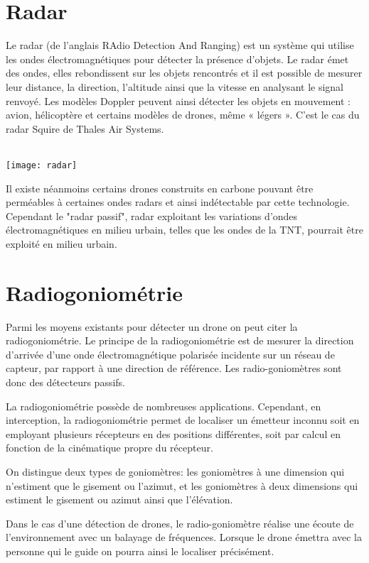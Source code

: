 \section{Radar}
Le radar (de l'anglais RAdio Detection And Ranging) est un système qui utilise les ondes électromagnétiques pour détecter la présence d'objets. Le radar émet des ondes, elles rebondissent sur les objets rencontrés et il est possible de mesurer leur distance, la direction, l'altitude ainsi que la vitesse en analysant le signal renvoyé. Les modèles Doppler peuvent ainsi détecter les objets en mouvement : avion, hélicoptère et certains modèles de drones, même « légers ». C'est le cas du radar Squire de Thales Air Systems. 

~\\

\texttt{[image: radar]}

Il existe néanmoins certains drones construits en carbone pouvant être perméables à certaines ondes radars et ainsi indétectable par cette technologie. Cependant le "radar passif", radar exploitant les variations d'ondes électromagnétiques en milieu urbain, telles que les ondes de la TNT, pourrait être exploité en milieu urbain.



\section{Radiogoniométrie}

Parmi les moyens existants pour détecter un drone on peut citer la radiogoniométrie. Le principe de la radiogoniométrie est de mesurer la direction d'arrivée d'une onde électromagnétique polarisée incidente sur un réseau de capteur, par rapport à une direction de référence. Les radio-goniomètres sont donc des détecteurs passifs. 

La radiogoniométrie possède de nombreuses applications. Cependant, en interception, la radiogoniométrie permet de localiser un émetteur inconnu soit en employant plusieurs récepteurs en des positions différentes, soit par calcul en fonction de la cinématique propre du récepteur. 

On distingue deux types de goniomètres: les goniomètres à une dimension qui n'estiment que le gisement ou l'azimut, et les goniomètres à deux dimensions qui estiment le gisement ou azimut ainsi que l'élévation. 


Dans le cas d'une détection de drones, le radio-goniomètre réalise une écoute de l'environnement avec un balayage de fréquences. Lorsque le drone émettra avec la personne qui le guide on pourra ainsi le localiser précisément.

